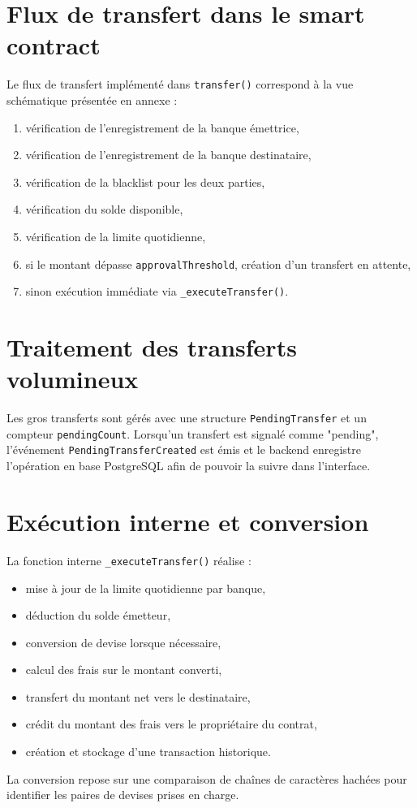\documentclass[a4paper,12pt]{report}
\begin{document}
\section{Flux de transfert dans le smart contract}
Le flux de transfert implémenté dans \texttt{transfer()} correspond à la vue schématique présentée en annexe :
\begin{enumerate}[leftmargin=*,nosep]
  \item vérification de l'enregistrement de la banque émettrice,
  \item vérification de l'enregistrement de la banque destinataire,
  \item vérification de la blacklist pour les deux parties,
  \item vérification du solde disponible,
  \item vérification de la limite quotidienne,
  \item si le montant dépasse \texttt{approvalThreshold}, création d'un transfert en attente,
  \item sinon exécution immédiate via \texttt{\_executeTransfer()}.
\end{enumerate}

\section{Traitement des transferts volumineux}
Les gros transferts sont gérés avec une structure \texttt{PendingTransfer} et un compteur \texttt{pendingCount}. Lorsqu'un transfert est signalé comme "pending", l'événement \texttt{PendingTransferCreated} est émis et le backend enregistre l'opération en base PostgreSQL afin de pouvoir la suivre dans l'interface.

\section{Exécution interne et conversion}
La fonction interne \texttt{\_executeTransfer()} réalise :
\begin{itemize}[leftmargin=*,nosep]
  \item mise à jour de la limite quotidienne par banque,
  \item déduction du solde émetteur,
  \item conversion de devise lorsque nécessaire,
  \item calcul des frais sur le montant converti,
  \item transfert du montant net vers le destinataire,
  \item crédit du montant des frais vers le propriétaire du contrat,
  \item création et stockage d'une transaction historique.
\end{itemize}
La conversion repose sur une comparaison de chaînes de caractères hachées pour identifier les paires de devises prises en charge.
\end{document}
